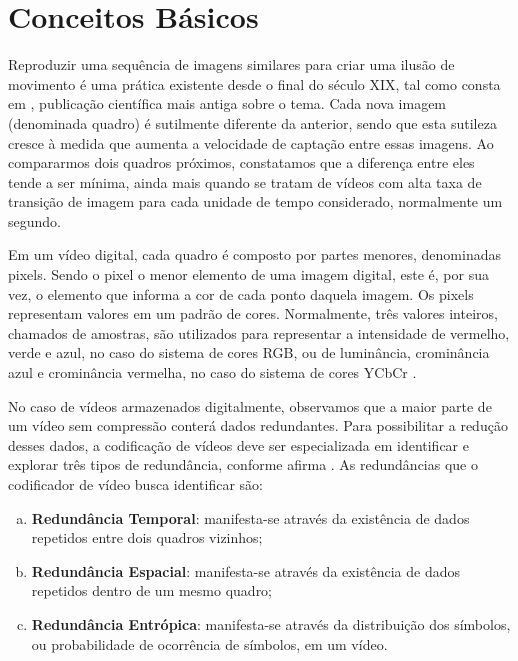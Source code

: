 \chapter{Conceitos Básicos}
\label{cap:2}

Reproduzir uma sequência de imagens similares para criar uma ilusão de movimento é uma prática existente desde o final do século XIX, tal como consta em \cite{bib:sciam_firstmotion}, publicação científica mais antiga sobre o tema. Cada nova imagem (denominada quadro) é sutilmente diferente da anterior, sendo que esta sutileza cresce à medida que aumenta a velocidade de captação entre essas imagens. Ao compararmos dois quadros próximos, constatamos que a diferença entre eles tende a ser mínima, ainda mais quando se tratam de vídeos com alta taxa de transição de imagem para cada unidade de tempo considerado, normalmente um segundo. 

Em um vídeo digital, cada quadro é composto por partes menores, denominadas pixels. Sendo o pixel o menor elemento de uma imagem digital, este é, por sua vez, o elemento que informa a cor de cada ponto daquela imagem. Os pixels representam valores em um padrão de cores. Normalmente, três valores inteiros, chamados de amostras, são utilizados para representar a intensidade de vermelho, verde e azul, no caso do sistema de cores RGB, ou de luminância, crominância azul e crominância vermelha, no caso do sistema de cores YCbCr \cite{bib:sistema_cores}.

No caso de vídeos armazenados digitalmente, observamos que a maior parte de um vídeo sem compressão conterá dados redundantes. Para possibilitar a redução desses dados, a codificação de vídeos deve ser especializada em identificar e explorar três tipos de redundância, conforme afirma \cite{bib:tese_agostini_2007}. As redundâncias que o codificador de vídeo busca identificar são: 

\begin{enumerate}[a)]
    \item \textbf{Redundância Temporal}: manifesta-se através da existência de dados repetidos entre dois quadros vizinhos;

    \item \textbf{Redundância Espacial}: manifesta-se através da existência de dados repetidos dentro de um mesmo quadro;

    \item \textbf{Redundância Entrópica}: manifesta-se através da distribuição dos símbolos, ou probabilidade de ocorrência de símbolos, em um vídeo.
\end{enumerate}

